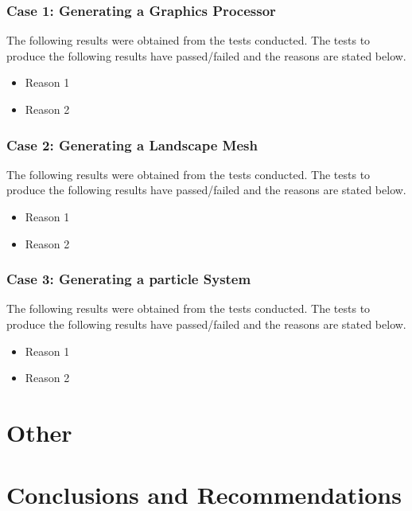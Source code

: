 \documentclass[11pt]{article}
\begin{document}
\subsubsection{Case 1: Generating a Graphics Processor}
The following results were obtained from the tests conducted. The tests to produce the
following results have passed/failed and the reasons are stated below.

\begin{itemize}
	\item Reason 1
	\item Reason 2
\end{itemize}

\subsubsection{Case 2: Generating a Landscape Mesh}
The following results were obtained from the tests conducted. The tests to produce the
following results have passed/failed and the reasons are stated below.

\begin{itemize}
	\item Reason 1
	\item Reason 2
\end{itemize}

\subsubsection{Case 3: Generating a particle System}
The following results were obtained from the tests conducted. The tests to produce the
following results have passed/failed and the reasons are stated below.

\begin{itemize}
	\item Reason 1
	\item Reason 2
\end{itemize}

\section{Other}

\section{Conclusions and Recommendations}
\end{document}
